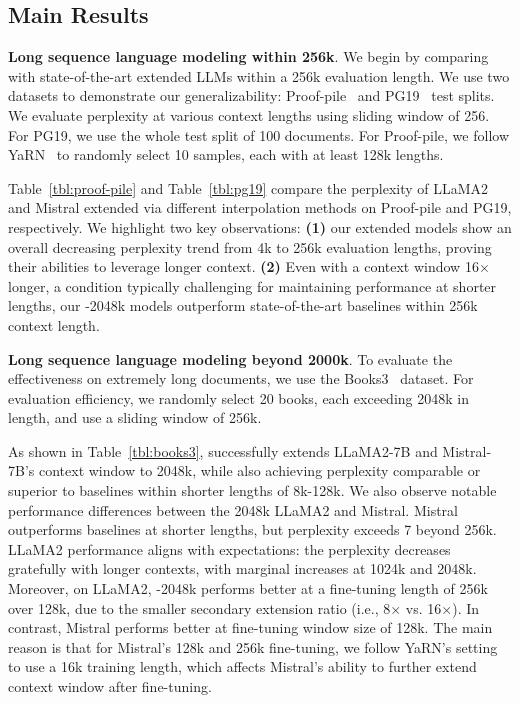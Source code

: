 \documentclass{article}
\theoremstyle{plain}
\theoremstyle{definition}
\theoremstyle{remark}
\begin{document}
\subsection{Main Results}
\label{sec:mainresult}
\noindent\textbf{Long sequence language modeling within 256k}. 
We begin by comparing  with state-of-the-art extended LLMs within a 256k evaluation length. We use two datasets to demonstrate our generalizability: Proof-pile~\cite{pg19} and PG19~\cite{pile} test splits. We evaluate perplexity at various context lengths using  sliding window of 256. For PG19, we use the whole test split of 100 documents. For Proof-pile, we follow YaRN~\cite{yarn} to randomly select 10 samples, each with at  least 128k lengths. 

Table~\ref{tbl:proof-pile} and Table~\ref{tbl:pg19} compare the perplexity of LLaMA2 and Mistral extended via different interpolation methods on Proof-pile and PG19, respectively. We highlight two key observations: \textbf{(1)} our extended models show an overall decreasing perplexity trend   from 4k to 256k evaluation lengths, proving their abilities to leverage longer context. \textbf{(2)} Even with a context window 16$\times$ longer, a condition typically challenging for maintaining performance at shorter lengths, our {\sysname}-2048k models outperform state-of-the-art baselines within 256k context length.



\noindent\textbf{Long sequence language modeling beyond 2000k}. 
 To evaluate the effectiveness on extremely long documents, we use the Books3~\cite{pile} dataset. For evaluation efficiency, we randomly select 20 books, each  exceeding 2048k in length, and use a sliding window of 256k. 

As shown in Table~\ref{tbl:books3}, {\sysname} successfully extends LLaMA2-7B and Mistral-7B's context window to 2048k, while also achieving perplexity comparable or superior to baselines within shorter lengths of 8k-128k. We also observe notable performance differences between the 2048k LLaMA2 and Mistral.  Mistral outperforms baselines at shorter lengths, but perplexity exceeds 7 beyond 256k. LLaMA2 performance aligns with expectations: the perplexity decreases gratefully with longer contexts, with marginal increases at 1024k and 2048k. 
Moreover, on LLaMA2, {\sysname}-2048k performs better at a fine-tuning length of 256k over 128k, due to the smaller secondary extension ratio (i.e., 8$\times$ vs. 16$\times$). In contrast, Mistral performs better at fine-tuning window size of 128k.  The main reason is that for Mistral's 128k and 256k fine-tuning, we follow YaRN's setting to use a 16k training length, which affects Mistral's ability to further extend context window after fine-tuning.  
 
\end{document}
